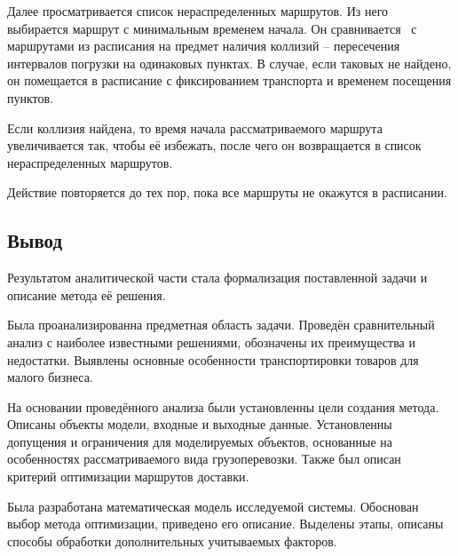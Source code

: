 Далее просматривается список нераспределенных маршрутов. Из него \, выбирается маршрут с минимальным временем начала. Он сравнивается \, с \, маршрутами из расписания на предмет наличия коллизий -- пересечения интервалов погрузки на одинаковых пунктах. В случае, если таковых не найдено, он помещается в расписание с фиксированием транспорта и временем посещения пунктов. 

Если коллизия найдена, то время начала рассматриваемого маршрута увеличивается так, чтобы её избежать, после чего он возвращается в список нераспределенных маршрутов. 

Действие повторяется до тех пор, пока все маршруты не окажутся в расписании.

\subsection*{Вывод}
Результатом аналитической части стала формализация поставленной задачи и описание метода её решения.

Была проанализированна предметная область задачи. Проведён сравнительный анализ с наиболее известными решениями, обозначены их преимущества и недостатки. Выявлены основные особенности транспортировки товаров для малого бизнеса.

На основании проведённого анализа были установленны цели создания метода. Описаны объекты модели, входные и выходные данные. Установленны допущения и ограничения для моделируемых объектов, основанные на особенностях рассматриваемого вида грузоперевозки. Также был описан критерий оптимизации маршрутов доставки.

Была разработана математическая модель исследуемой системы. Обоснован выбор метода оптимизации, приведено его описание. Выделены этапы, описаны способы обработки дополнительных учитываемых факторов.

\pagebreak